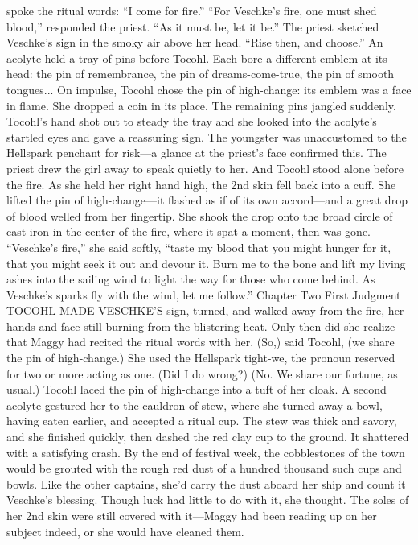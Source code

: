 \documentclass[9pt]{article}
\begin{document}
spoke the ritual words: “I come for fire.”
“For Veschke’s fire, one must shed blood,” responded the priest.
“As it must be, let it be.”
The priest sketched Veschke’s sign in the smoky air above her head. “Rise then, and choose.”
An acolyte held a tray of pins before Tocohl. Each bore a different emblem at its head: the pin of
remembrance, the pin of dreams-come-true, the pin of smooth tongues...
On impulse, Tocohl chose the pin of high-change: its emblem was a face in flame. She dropped a
coin in its place. The remaining pins jangled suddenly. Tocohl’s hand shot out to steady the tray and she
looked into the acolyte’s startled eyes and gave a reassuring sign.
The youngster was unaccustomed to the Hellspark penchant for risk—a glance at the priest’s face
confirmed this. The priest drew the girl away to speak quietly to her.
And Tocohl stood alone before the fire. As she held her right hand high, the 2nd skin fell back into a
cuff. She lifted the pin of high-change—it flashed as if of its own accord—and a great drop of blood
welled from her fingertip. She shook the drop onto the broad circle of cast iron in the center of the fire,
where it spat a moment, then was gone.
“Veschke’s fire,” she said softly, “taste my blood that you might hunger for it, that you might seek it
out and devour it. Burn me to the bone and lift my living ashes into the sailing wind to light the way for
those who come behind. As Veschke’s sparks fly with the wind, let me follow.”
Chapter Two
First Judgment
TOCOHL MADE VESCHKE’S sign, turned, and walked away from the fire, her hands and face
still burning from the blistering heat. Only then did she realize that Maggy had recited the ritual words with
her.
(So,) said Tocohl, (we share the pin of high-change.) She used the Hellspark tight-we, the pronoun
reserved for two or more acting as one.
(Did I do wrong?)
(No. We share our fortune, as usual.) Tocohl laced the pin of high-change into a tuft of her cloak.
A second acolyte gestured her to the cauldron of stew, where she turned away a bowl, having eaten
earlier, and accepted a ritual cup. The stew was thick and savory, and she finished quickly, then dashed
the red clay cup to the ground. It shattered with a satisfying crash. By the end of festival week, the
cobblestones of the town would be grouted with the rough red dust of a hundred thousand such cups and
bowls. Like the other captains, she’d carry the dust aboard her ship and count it Veschke’s blessing.
Though luck had little to do with it, she thought. The soles of her 2nd skin were still covered with
it—Maggy had been reading up on her subject indeed, or she would have cleaned them.
\end{document}
